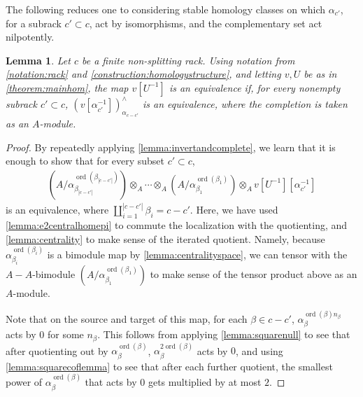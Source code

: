 \documentclass[12 pt]{amsart}
\theoremstyle{plain}
\newtheorem{lemma}[theorem]{Lemma}
\theoremstyle{definition}
\theoremstyle{remark}
\numberwithin{equation}{section}
\DeclareMathOperator\ord{ord}
\begin{document}
	The following reduces one to considering stable homology classes on
	which $\alpha_{c'}$, for a subrack $c' \subset c$, act by isomorphisms, and the complementary set act nilpotently.
\begin{lemma}\label{lemma:reductionstep}
	Let $c$ be a finite non-splitting rack. Using notation from \autoref{notation:rack} and
	\autoref{construction:homologystructure}, and letting $v,U$ be as in \autoref{theorem:mainhom},
	the map $v[U^{-1}]$
	is an equivalence if, for every nonempty
	subrack $c' \subset c$, $(v[\alpha_{c'}^{-1}])^\wedge_{\alpha_{c-c'}}$ is an
	equivalence, where the completion is taken as an $A$-module.
\end{lemma}
\begin{proof}
	By repeatedly applying \autoref{lemma:invertandcomplete}, we learn that it
	is enough to show that for every subset $c'\subset c$,
	\begin{align}
		\label{equation:localize-and-quotient-map}
		(A/\alpha^{\ord(\beta_{|c-c'|})}_{\beta_{|c-c'|}})\otimes_A\cdots
		\otimes_A
		(A/\alpha^{\ord(\beta_1)}_{\beta_1})\otimes_Av[U^{-1}][\alpha_{c'}^{-1}] 
	\end{align}
is an equivalence, where $\coprod_{i=1}^{|c-c'|}\beta_i=c-c'$. Here, we have used \autoref{lemma:e2centralhomepi} to commute the localization with the quotienting,
and \autoref{lemma:centrality} to make sense of the iterated quotient. Namely,
because $\alpha_{\beta_i}^{\ord(\beta_{i})}$ is a bimodule map by
\autoref{lemma:centralityspace}, we can tensor with the $A-A$-bimodule $(A/\alpha^{\ord(\beta_1)}_{\beta_1})$ to make sense of the tensor product above as an $A$-module.

	Note that on the source and target of this map, for each $\beta \in c-c'$,
	$\alpha_{\beta}^{\ord(\beta)n_{\beta}}$ acts by 0 for some $n_{\beta}$. This
	follows from applying \autoref{lemma:squarenull} to see that after
	quotienting out by $\alpha_{\beta}^{\ord(\beta)}$,
	$\alpha_{\beta}^{2\ord(\beta)}$ acts by $0$, and using
	\autoref{lemma:squarecoflemma} to see that after each further quotient,
	the smallest power of $\alpha_{\beta}^{\ord(\beta)}$ that acts by $0$ gets multiplied by at most $2$.
	

\end{proof}
\end{document}
